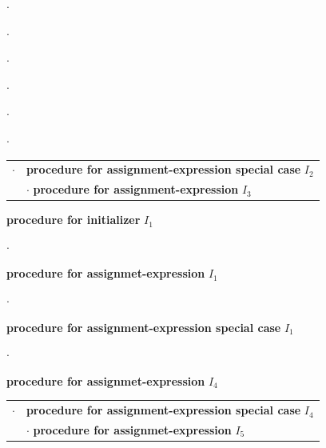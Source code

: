 \begin{Example}
\begin{list}{$\cdot$}{}
\begin{list}{$\cdot$}{}
\begin{list}{$\cdot$}{}
\begin{list}{$\cdot$}{}
\begin{list}{$\cdot$}{}
\begin{list}{$\cdot$}{}
                         \begin{tabular}{cl}
                         $\cdot$ & {\bf procedure for
                          assignment-expression special case} $I_2$ \\
                                 & $\cdot$ {\bf procedure for
			   assignment-expression} $I_3$  \\
                         \end{tabular}
                    \end{list}
                \end{list}
            \end{list}
        \item {\bf procedure for initializer} $I_1$
            \begin{list}{$\cdot$}{}
            \item {\bf procedure for assignmet-expression} $I_1$
                \begin{list}{$\cdot$}{}
                \item {\bf procedure for assignment-expression special case} $I_1$
                    \begin{list}{$\cdot$}{}
                    \item {\bf procedure for assignmet-expression} $I_4$

                         \begin{tabular}{cl}
                         $\cdot$ & {\bf procedure for
                          assignment-expression special case} $I_4$ \\
                                 & $\cdot$ {\bf procedure for assignmet-expression} $I_5$  \\
                         \end{tabular}

                    \end{list}
                \end{list}
            \end{list}
        \end{list}
    \end{list}
\end{list}

\end{Example}

